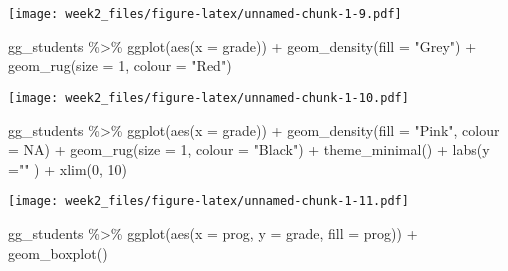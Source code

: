 \documentclass[
]{article}
\newenvironment{Shaded}{\begin{snugshade}}{\end{snugshade}}
\newcommand{\AttributeTok}[1]{\textcolor[rgb]{0.77,0.63,0.00}{#1}}
\newcommand{\ConstantTok}[1]{\textcolor[rgb]{0.00,0.00,0.00}{#1}}
\newcommand{\DecValTok}[1]{\textcolor[rgb]{0.00,0.00,0.81}{#1}}
\newcommand{\FunctionTok}[1]{\textcolor[rgb]{0.00,0.00,0.00}{#1}}
\newcommand{\NormalTok}[1]{#1}
\newcommand{\SpecialCharTok}[1]{\textcolor[rgb]{0.00,0.00,0.00}{#1}}
\newcommand{\StringTok}[1]{\textcolor[rgb]{0.31,0.60,0.02}{#1}}
\begin{document}
\texttt{[image: week2\_files/figure-latex/unnamed-chunk-1-9.pdf]}

\begin{Shaded}
\begin{Highlighting}[]
\NormalTok{  gg\_students }\SpecialCharTok{\%\textgreater{}\%} 
    \FunctionTok{ggplot}\NormalTok{(}\FunctionTok{aes}\NormalTok{(}\AttributeTok{x =}\NormalTok{ grade)) }\SpecialCharTok{+} \FunctionTok{geom\_density}\NormalTok{(}\AttributeTok{fill =} \StringTok{"Grey"}\NormalTok{) }\SpecialCharTok{+} \FunctionTok{geom\_rug}\NormalTok{(}\AttributeTok{size =} \DecValTok{1}\NormalTok{, }\AttributeTok{colour =} \StringTok{"Red"}\NormalTok{)}
\end{Highlighting}
\end{Shaded}

\texttt{[image: week2\_files/figure-latex/unnamed-chunk-1-10.pdf]}

\begin{Shaded}
\begin{Highlighting}[]
\NormalTok{    gg\_students }\SpecialCharTok{\%\textgreater{}\%}
    \FunctionTok{ggplot}\NormalTok{(}\FunctionTok{aes}\NormalTok{(}\AttributeTok{x =}\NormalTok{ grade)) }\SpecialCharTok{+} \FunctionTok{geom\_density}\NormalTok{(}\AttributeTok{fill =} \StringTok{"Pink"}\NormalTok{, }\AttributeTok{colour =} \ConstantTok{NA}\NormalTok{) }\SpecialCharTok{+} \FunctionTok{geom\_rug}\NormalTok{(}\AttributeTok{size =} \DecValTok{1}\NormalTok{, }\AttributeTok{colour =} \StringTok{"Black"}\NormalTok{) }\SpecialCharTok{+} \FunctionTok{theme\_minimal}\NormalTok{() }\SpecialCharTok{+} \FunctionTok{labs}\NormalTok{(}\AttributeTok{y =}\StringTok{""}\NormalTok{ ) }\SpecialCharTok{+} \FunctionTok{xlim}\NormalTok{(}\DecValTok{0}\NormalTok{, }\DecValTok{10}\NormalTok{)}
\end{Highlighting}
\end{Shaded}

\texttt{[image: week2\_files/figure-latex/unnamed-chunk-1-11.pdf]}

\begin{Shaded}
\begin{Highlighting}[]
\NormalTok{  gg\_students }\SpecialCharTok{\%\textgreater{}\%} 
    \FunctionTok{ggplot}\NormalTok{(}\FunctionTok{aes}\NormalTok{(}\AttributeTok{x =}\NormalTok{ prog, }\AttributeTok{y =}\NormalTok{ grade, }\AttributeTok{fill =}\NormalTok{ prog)) }\SpecialCharTok{+} \FunctionTok{geom\_boxplot}\NormalTok{() }
\end{Highlighting}
\end{Shaded}
\end{document}
